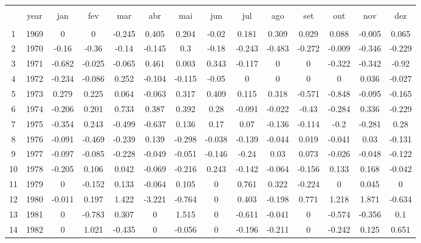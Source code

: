 
\begin{table}[!htbp] \centering 
  \caption{} 
  \label{} 
\begin{tabular}{@{\extracolsep{5pt}} cccccccccccccc} 
\\[-1.8ex]\hline 
\hline \\[-1.8ex] 
 & year & jan & fev & mar & abr & mai & jun & jul & ago & set & out & nov & dez \\ 
\hline \\[-1.8ex] 
1 & 1969 & 0 & 0 & -0.245 & 0.405 & 0.204 & -0.02 & 0.181 & 0.309 & 0.029 & 0.088 & -0.005 & 0.065 \\ 
2 & 1970 & -0.16 & -0.36 & -0.14 & -0.145 & 0.3 & -0.18 & -0.243 & -0.483 & -0.272 & -0.009 & -0.346 & -0.229 \\ 
3 & 1971 & -0.682 & -0.025 & -0.065 & 0.461 & 0.003 & 0.343 & -0.117 & 0 & 0 & -0.322 & -0.342 & -0.92 \\ 
4 & 1972 & -0.234 & -0.086 & 0.252 & -0.104 & -0.115 & -0.05 & 0 & 0 & 0 & 0 & 0.036 & -0.027 \\ 
5 & 1973 & 0.279 & 0.225 & 0.064 & -0.063 & 0.317 & 0.409 & 0.115 & 0.318 & -0.571 & -0.848 & -0.095 & -0.165 \\ 
6 & 1974 & -0.206 & 0.201 & 0.733 & 0.387 & 0.392 & 0.28 & -0.091 & -0.022 & -0.43 & -0.284 & 0.336 & -0.229 \\ 
7 & 1975 & -0.354 & 0.243 & -0.499 & -0.637 & 0.136 & 0.17 & 0.07 & -0.136 & -0.114 & -0.2 & -0.281 & 0.28 \\ 
8 & 1976 & -0.091 & -0.469 & -0.239 & 0.139 & -0.298 & -0.038 & -0.139 & -0.044 & 0.019 & -0.041 & 0.03 & -0.131 \\ 
9 & 1977 & -0.097 & -0.085 & -0.228 & -0.049 & -0.051 & -0.146 & -0.24 & 0.03 & 0.073 & -0.026 & -0.048 & -0.122 \\ 
10 & 1978 & -0.205 & 0.106 & 0.042 & -0.069 & -0.216 & 0.243 & -0.142 & -0.064 & -0.156 & 0.133 & 0.168 & -0.042 \\ 
11 & 1979 & 0 & -0.152 & 0.133 & -0.064 & 0.105 & 0 & 0.761 & 0.322 & -0.224 & 0 & 0.045 & 0 \\ 
12 & 1980 & -0.011 & 0.197 & 1.422 & -3.221 & -0.764 & 0 & 0.403 & -0.198 & 0.771 & 1.218 & 1.871 & -0.634 \\ 
13 & 1981 & 0 & -0.783 & 0.307 & 0 & 1.515 & 0 & -0.611 & -0.041 & 0 & -0.574 & -0.356 & 0.1 \\ 
14 & 1982 & 0 & 1.021 & -0.435 & 0 & -0.056 & 0 & -0.196 & -0.211 & 0 & -0.242 & 0.125 & 0.651 \\ 

\end{tabular}
\end{table}
